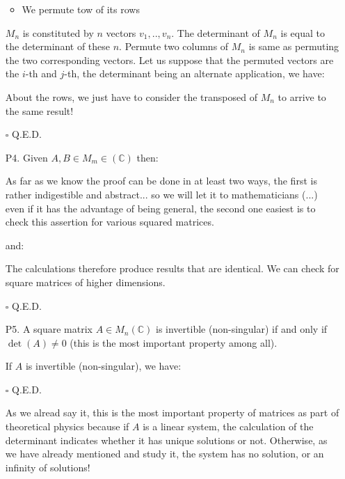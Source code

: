 \begin{enumerate}
\begin{itemize}
			\item We permute tow of its rows
		\end{itemize}
		\begin{dem}
		$M_n$ is constituted by $n$ vectors $v_1,..,v_n$. The determinant of $M_n$ is equal to the determinant of these $n$. Permute two columns of $M_n$ is same as permuting the two corresponding vectors. Let us suppose that the permuted vectors are the $i$-th and $j$-th, the determinant being an alternate application, we have:
		
	About the rows, we just have to consider the transposed of $M_n$ to arrive to the same result!
		\begin{flushright}
			$\square$  Q.E.D.
		\end{flushright}
		\end{dem}
		
		\item[P4.] Given $A,B\in M_m\in (\mathbb{C})$ then:
		
		As far as we know the proof can be done in at least two ways, the first is rather indigestible and abstract... so we will let it to mathematicians (...) even if it has the advantage of being general, the second one easiest is to check this assertion for various squared matrices.
		\begin{dem}
		
		and:
		
		The calculations therefore produce results that are identical. We can check for square matrices of higher dimensions.
		\begin{flushright}
			$\square$  Q.E.D.
		\end{flushright}
		\end{dem}
		
		\item[P5.] A square matrix $A\in M_n(\mathbb{C})$ is invertible (non-singular) if and only if $\det(A)\neq 0$ (this is the most important property among all).
		\begin{dem}
		If $A$ is invertible (non-singular), we have:
		
		\begin{flushright}
			$\square$  Q.E.D.
		\end{flushright}
		\end{dem}
		As we alread say it, this is the most important property of matrices as part of theoretical physics because if $A$ is a linear system, the calculation of the determinant indicates whether it has unique solutions or not. Otherwise, as we have already mentioned and study it, the system has no solution, or an infinity of solutions!
		

\end{enumerate}

